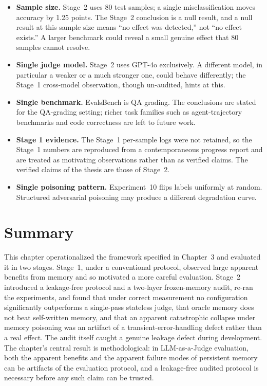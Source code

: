 \documentclass[12pt,a4paper]{report}
\begin{document}
\begin{itemize}
    \item \textbf{Sample size.} Stage~2 uses 80 test samples; a single misclassification moves accuracy by 1.25 points. The Stage~2 conclusion is a null result, and a null result at this sample size means ``no effect was detected,'' not ``no effect exists.'' A larger benchmark could reveal a small genuine effect that 80 samples cannot resolve.
    \item \textbf{Single judge model.} Stage~2 uses GPT-4o exclusively. A different model, in particular a weaker or a much stronger one, could behave differently; the Stage~1 cross-model observation, though un-audited, hints at this.
    \item \textbf{Single benchmark.} EvalsBench is QA grading. The conclusions are stated for the QA-grading setting; richer task families such as agent-trajectory benchmarks \cite{tau_knowledge2026} and code correctness \cite{mcts_judge2025} are left to future work.
    \item \textbf{Stage 1 evidence.} The Stage~1 per-sample logs were not retained, so the Stage~1 numbers are reproduced from a contemporaneous progress report and are treated as motivating observations rather than as verified claims. The verified claims of the thesis are those of Stage~2.
    \item \textbf{Single poisoning pattern.} Experiment~10 flips labels uniformly at random. Structured adversarial poisoning may produce a different degradation curve.
\end{itemize}

\section{Summary}

This chapter operationalized the framework specified in Chapter~3 and evaluated it in two stages. Stage~1, under a conventional protocol, observed large apparent benefits from memory and so motivated a more careful evaluation. Stage~2 introduced a leakage-free protocol and a two-layer frozen-memory audit, re-ran the experiments, and found that under correct measurement no configuration significantly outperforms a single-pass stateless judge, that oracle memory does not beat self-written memory, and that an apparent catastrophic collapse under memory poisoning was an artifact of a transient-error-handling defect rather than a real effect. The audit itself caught a genuine leakage defect during development. The chapter's central result is methodological: in LLM-as-a-Judge evaluation, both the apparent benefits and the apparent failure modes of persistent memory can be artifacts of the evaluation protocol, and a leakage-free audited protocol is necessary before any such claim can be trusted.



\end{document}
